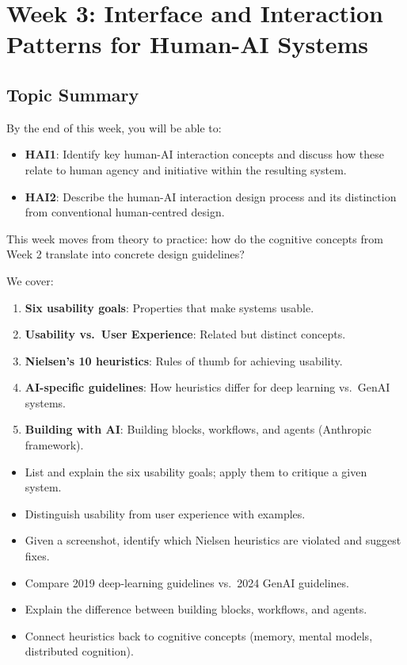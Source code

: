 \section{Week 3: Interface and Interaction Patterns for Human-AI Systems}

\subsection{Topic Summary}

\begin{keybox}
By the end of this week, you will be able to:
\begin{itemize}
  \item \textbf{HAI1}: Identify key human-AI interaction concepts and discuss how these relate to human agency and initiative within the resulting system.
  \item \textbf{HAI2}: Describe the human-AI interaction design process and its distinction from conventional human-centred design.
\end{itemize}
\end{keybox}

\begin{keybox}
This week moves from theory to practice: how do the cognitive concepts from Week 2 translate into concrete design guidelines?

We cover:
\begin{enumerate}
  \item \textbf{Six usability goals}: Properties that make systems usable.
  \item \textbf{Usability vs.\ User Experience}: Related but distinct concepts.
  \item \textbf{Nielsen's 10 heuristics}: Rules of thumb for achieving usability.
  \item \textbf{AI-specific guidelines}: How heuristics differ for deep learning vs.\ GenAI systems.
  \item \textbf{Building with AI}: Building blocks, workflows, and agents (Anthropic framework).
\end{enumerate}
\end{keybox}

\begin{keybox}
\begin{itemize}
  \item List and explain the six usability goals; apply them to critique a given system.
  \item Distinguish usability from user experience with examples.
  \item Given a screenshot, identify which Nielsen heuristics are violated and suggest fixes.
  \item Compare 2019 deep-learning guidelines vs.\ 2024 GenAI guidelines.
  \item Explain the difference between building blocks, workflows, and agents.
  \item Connect heuristics back to cognitive concepts (memory, mental models, distributed cognition).
\end{itemize}
\end{keybox}

